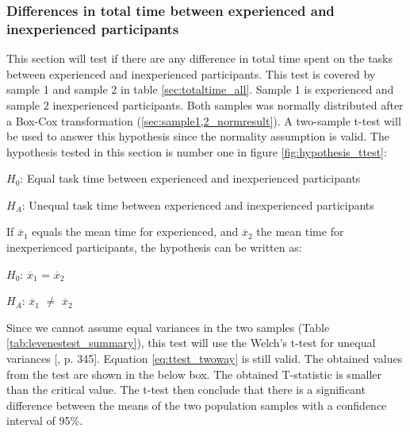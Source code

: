 \subsubsection[Sample 1, 2]{Differences in total time between experienced and inexperienced participants}\label{sec:t-test_result} 
This section will test if there are any difference in total time spent on the tasks between experienced and inexperienced participants. This test is covered by sample 1 and sample 2 in table \ref{sec:totaltime_all}. Sample 1 is experienced and sample 2 inexperienced participants. Both samples was normally distributed after a Box-Cox transformation (\ref{sec:sample1,2_normresult}). A two-sample t-test will be used to answer this hypothesis since the normality assumption is valid. The hypothesis tested in this section is number one in figure \ref{fig:hypothesis_ttest}: \\[0.3cm]

\centerline{$H_{0}$: Equal task time between experienced and inexperienced participants} 
\centerline{$H_{A}$: Unequal task time between experienced and inexperienced participants}
\vspace{0.3cm}

If $\overline{x}_1$ equals the mean time for experienced, and $\overline{x}_2$ the mean time for inexperienced participants, the hypothesis can be written as:\\[0.3cm]

\centerline{$H_{0}$: $\overline{x}_1$ = $\overline{x}_2$} 
\centerline{$H_{A}$: $\overline{x}_1$ $\neq$ $\overline{x}_2$}

\vspace{0.3cm}

Since we cannot assume equal variances in the two samples (Table \ref{tab:levenestest_summary}), this test will use the Welch's t-test for unequal variances [\citep{Walpole2012}, p. 345]. Equation \ref{eq:ttest_twoway} is still valid. The obtained values from the test are shown in the below box. The obtained T-statistic is smaller than the critical value. The t-test then conclude that there is a significant difference between the means of the two population samples with a confidence interval of 95\%.\\[0.2cm]

